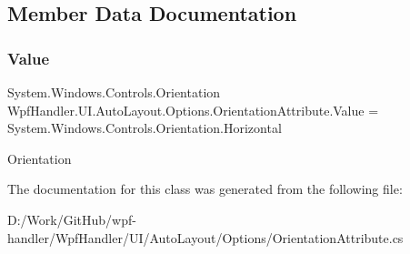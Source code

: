 \subsection{Member Data Documentation}
\mbox{\label{class_wpf_handler_1_1_u_i_1_1_auto_layout_1_1_options_1_1_orientation_attribute_aa0e346725fdf25d2172e0811e12000ed}} 
\subsubsection{\texorpdfstring{Value}{Value}}
{\footnotesize\ttfamily System.\+Windows.\+Controls.\+Orientation Wpf\+Handler.\+U\+I.\+Auto\+Layout.\+Options.\+Orientation\+Attribute.\+Value = System.\+Windows.\+Controls.\+Orientation.\+Horizontal}



Orientation 



The documentation for this class was generated from the following file\+:\begin{DoxyCompactItemize}
\item 
D\+:/\+Work/\+Git\+Hub/wpf-\/handler/\+Wpf\+Handler/\+U\+I/\+Auto\+Layout/\+Options/Orientation\+Attribute.\+cs\end{DoxyCompactItemize}
